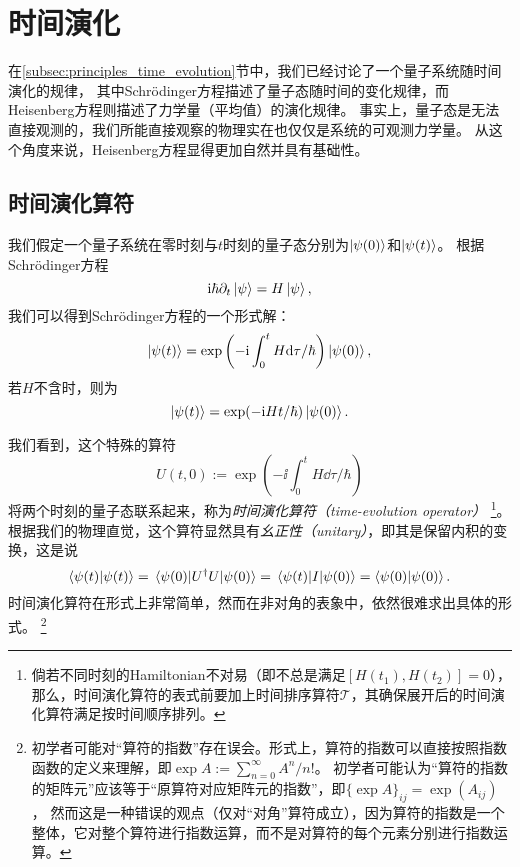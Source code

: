 \section{时间演化}
\label{sec:time_evol}

在\ref{subsec:principles_time_evolution}节中，我们已经讨论了一个量子系统随时间演化的规律，
其中Schrödinger方程描述了量子态随时间的变化规律，而Heisenberg方程则描述了力学量（平均值）的演化规律。
事实上，量子态是无法直接观测的，我们所能直接观察的物理实在也仅仅是系统的可观测力学量。
从这个角度来说，Heisenberg方程显得更加自然并具有基础性。

\subsection{时间演化算符}

我们假定一个量子系统在零时刻与$t$时刻的量子态分别为$\ket{\psi(0)}$和$\ket{\psi(t)}$。
根据Schrödinger方程
\begin{equation}
    \mathrm{i}\hbar\partial_t\ket{\psi} = H\ket{\psi},
\end{equation}
我们可以得到Schrödinger方程的一个形式解：
\begin{equation}
    \ket{\psi(t)} = \exp\left(-\mathrm{i} \int_0^t H \dd\tau /\hbar\right)\ket{\psi(0)},
\end{equation}
若$H$不含时，则为
\begin{equation}
    \ket{\psi(t)} = \exp(-\mathrm{i} H t/\hbar)\ket{\psi(0)}.
\end{equation}

我们看到，这个特殊的算符
\begin{equation}
    U(t,0) := \exp\left(-\ii \int_0^t H \dd\tau /\hbar\right)
\end{equation}
将两个时刻的量子态联系起来，称为\emph{时间演化算符（time-evolution operator）}
\footnote{倘若不同时刻的Hamiltonian不对易（即不总是满足$[H(t_1),H(t_2)]=0$），那么，时间演化算符的表式前要加上时间排序算符$𝒯$，其确保展开后的时间演化算符满足按时间顺序排列。}。
根据我们的物理直觉，这个算符显然具有\emph{幺正性（unitary）}，即其是保留内积的变换，这是说
\begin{equation}
    \innerproduct{\psi(t)}{\psi(t)} = \mel{\psi(0)}{U^\dag U}{\psi(0)} = \mel{\psi(t)}{I}{\psi(0)} = \innerproduct{\psi(0)}{\psi(0)}.
\end{equation}
时间演化算符在形式上非常简单，然而在非对角的表象中，依然很难求出具体的形式。
\footnote{初学者可能对``算符的指数''存在误会。形式上，算符的指数可以直接按照指数函数的定义来理解，即$\exp A := \sum_{n=0}^\infty A^n/n!$。
    初学者可能认为``算符的指数的矩阵元''应该等于``原算符对应矩阵元的指数''，即$\{\exp A\}_{ij} = \exp(A_{ij})$，
    然而这是一种错误的观点（仅对``对角''算符成立），因为算符的指数是一个整体，它对整个算符进行指数运算，而不是对算符的每个元素分别进行指数运算。
}

